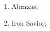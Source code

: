 \documentclass[a4paper,11pt]{article}
\begin{document}
\begin{enumerate}

\item Abraxas;



\item Iron Savior;








































\end{enumerate}
\end{document}
